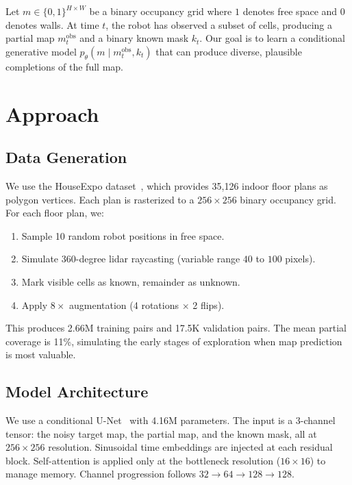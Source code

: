 \documentclass[conference]{IEEEtran}
\begin{document}
Let $m \in \{0,1\}^{H\times W}$ be a binary occupancy grid where $1$
denotes free space and $0$ denotes walls. At time $t$, the robot has
observed a subset of cells, producing a partial map $m^{\text{obs}}_t$
and a binary known mask $k_t$. Our goal is to learn a conditional
generative model $p_\theta(m \mid m^{\text{obs}}_t, k_t)$ that can
produce diverse, plausible completions of the full map.

\section{Approach}

\subsection{Data Generation}
We use the HouseExpo dataset~\cite{li2020houseexpo}, which provides
35{,}126 indoor floor plans as polygon vertices. Each plan is
rasterized to a $256 \times 256$ binary occupancy grid. For each
floor plan, we:
\begin{enumerate}
  \item Sample 10 random robot positions in free space.
  \item Simulate 360-degree lidar raycasting (variable range
        $40$ to $100$ pixels).
  \item Mark visible cells as known, remainder as unknown.
  \item Apply $8\times$ augmentation (4 rotations $\times$ 2 flips).
\end{enumerate}
This produces 2.66M training pairs and 17.5K validation pairs.
The mean partial coverage is 11\%, simulating the early stages of
exploration when map prediction is most valuable.

\subsection{Model Architecture}
We use a conditional U-Net~\cite{ronneberger2015} with 4.16M
parameters. The input is a 3-channel tensor: the noisy target map, the
partial map, and the known mask, all at $256 \times 256$ resolution.
Sinusoidal time embeddings are injected at each residual block.
Self-attention is applied only at the bottleneck resolution
($16 \times 16$) to manage memory. Channel progression follows
$32 \to 64 \to 128 \to 128$.
\end{document}
